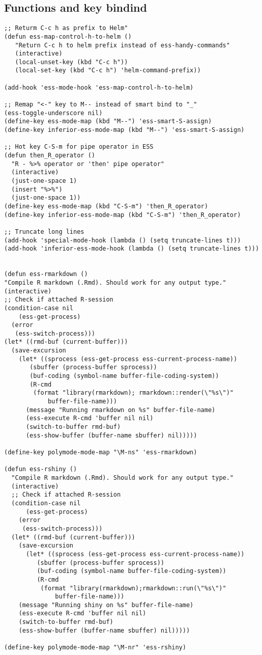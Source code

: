\documentclass[11pt]{article}
\begin{document}
\subsection{Functions and key bindind}
\label{sec:org2700791}
\begin{verbatim}
;; Returm C-c h as prefix to Helm"
(defun ess-map-control-h-to-helm ()
   "Return C-c h to helm prefix instead of ess-handy-commands"
   (interactive)
   (local-unset-key (kbd "C-c h"))
   (local-set-key (kbd "C-c h") 'helm-command-prefix))

(add-hook 'ess-mode-hook 'ess-map-control-h-to-helm)

;; Remap "<-" key to M-- instead of smart bind to "_"
(ess-toggle-underscore nil)
(define-key ess-mode-map (kbd "M--") 'ess-smart-S-assign)
(define-key inferior-ess-mode-map (kbd "M--") 'ess-smart-S-assign)

;; Hot key C-S-m for pipe operator in ESS
(defun then_R_operator ()
  "R - %>% operator or 'then' pipe operator"
  (interactive)
  (just-one-space 1)
  (insert "%>%")
  (just-one-space 1))
(define-key ess-mode-map (kbd "C-S-m") 'then_R_operator)
(define-key inferior-ess-mode-map (kbd "C-S-m") 'then_R_operator)

;; Truncate long lines
(add-hook 'special-mode-hook (lambda () (setq truncate-lines t)))
(add-hook 'inferior-ess-mode-hook (lambda () (setq truncate-lines t)))


(defun ess-rmarkdown ()
"Compile R markdown (.Rmd). Should work for any output type."
(interactive)
;; Check if attached R-session
(condition-case nil
    (ess-get-process)
  (error
   (ess-switch-process)))
(let* ((rmd-buf (current-buffer)))
  (save-excursion
    (let* ((sprocess (ess-get-process ess-current-process-name))
	   (sbuffer (process-buffer sprocess))
	   (buf-coding (symbol-name buffer-file-coding-system))
	   (R-cmd
	    (format "library(rmarkdown); rmarkdown::render(\"%s\")"
		    buffer-file-name)))
      (message "Running rmarkdown on %s" buffer-file-name)
      (ess-execute R-cmd 'buffer nil nil)
      (switch-to-buffer rmd-buf)
      (ess-show-buffer (buffer-name sbuffer) nil)))))

(define-key polymode-mode-map "\M-ns" 'ess-rmarkdown)

(defun ess-rshiny ()
  "Compile R markdown (.Rmd). Should work for any output type."
  (interactive)
  ;; Check if attached R-session
  (condition-case nil
      (ess-get-process)
    (error
     (ess-switch-process)))
  (let* ((rmd-buf (current-buffer)))
    (save-excursion
      (let* ((sprocess (ess-get-process ess-current-process-name))
	     (sbuffer (process-buffer sprocess))
	     (buf-coding (symbol-name buffer-file-coding-system))
	     (R-cmd
	      (format "library(rmarkdown);rmarkdown::run(\"%s\")"
		      buffer-file-name)))
	(message "Running shiny on %s" buffer-file-name)
	(ess-execute R-cmd 'buffer nil nil)
	(switch-to-buffer rmd-buf)
	(ess-show-buffer (buffer-name sbuffer) nil)))))

(define-key polymode-mode-map "\M-nr" 'ess-rshiny)

\end{verbatim}
\end{document}
